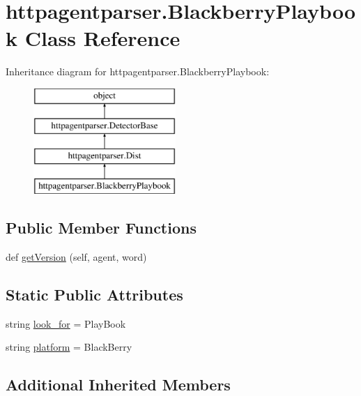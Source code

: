 \hypertarget{classhttpagentparser_1_1_blackberry_playbook}{}\section{httpagentparser.\+Blackberry\+Playbook Class Reference}
\label{classhttpagentparser_1_1_blackberry_playbook}
Inheritance diagram for httpagentparser.\+Blackberry\+Playbook\+:\begin{figure}[H]
\begin{center}
\leavevmode
\includegraphics[height=4.000000cm]{classhttpagentparser_1_1_blackberry_playbook}
\end{center}
\end{figure}
\subsection*{Public Member Functions}
\begin{DoxyCompactItemize}
\item 
def \hyperlink{classhttpagentparser_1_1_blackberry_playbook_a6c2264f4b6febc3ba9a3de63d4bdf67f}{get\+Version} (self, agent, word)
\end{DoxyCompactItemize}
\subsection*{Static Public Attributes}
\begin{DoxyCompactItemize}
\item 
string \hyperlink{classhttpagentparser_1_1_blackberry_playbook_a11a78eca2ec42a408a0576fa114470a4}{look\+\_\+for} = \textquotesingle{}Play\+Book\textquotesingle{}
\item 
string \hyperlink{classhttpagentparser_1_1_blackberry_playbook_ab173bb0349f595500322016722f73b30}{platform} = \textquotesingle{}Black\+Berry\textquotesingle{}
\end{DoxyCompactItemize}
\subsection*{Additional Inherited Members}


